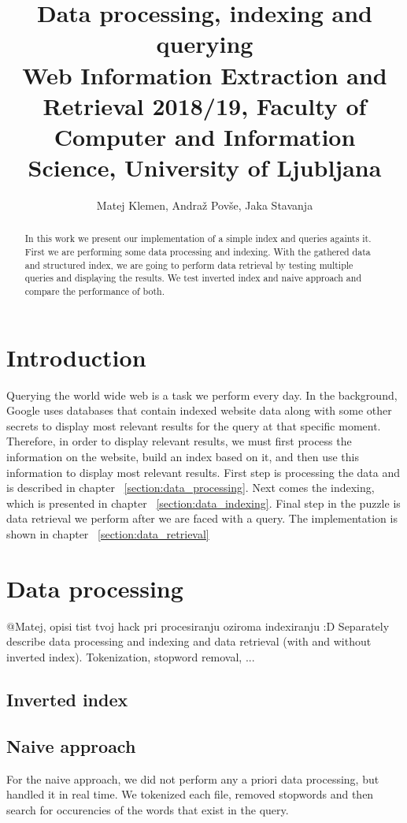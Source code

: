 \documentclass[9pt]{IEEEtran}
\title{\vspace{0ex} %
Data processing, indexing and querying
\\ \normalsize{Web Information Extraction and Retrieval 2018/19, Faculty of Computer and Information Science, University of Ljubljana}}
\author{ %
Matej Klemen, Andraž Povše, Jaka Stavanja
\vspace{-4.0ex}
}
\begin{document}
\maketitle

\begin{abstract}
In this work we present our implementation of a simple index and queries againts it.
First we are performing some data processing and indexing.
With the gathered data and structured index, we are going to perform data retrieval by testing multiple queries and displaying the results.
We test inverted index and naive approach and compare the performance of both.
\end{abstract}

\section{Introduction}
Querying the world wide web is a task we perform every day.
In the background, Google uses databases that contain indexed website data along with some other secrets to display most relevant results for the query at that specific moment.
Therefore, in order to display relevant results, we must first process the information on the website, build an index based on it, and then use this information to display most relevant results.
First step is processing the data and is described in chapter ~\ref{section:data_processing}.
Next comes the indexing, which is presented in chapter ~\ref{section:data_indexing}.
Final step in the puzzle is data retrieval we perform after we are faced with a query. The implementation is shown in chapter ~\ref{section:data_retrieval}

\section{Data processing}
@Matej, opisi tist tvoj hack pri procesiranju oziroma indexiranju :D 
\label{section:data_processing}
Separately describe data processing and indexing and data retrieval (with and without inverted index).
Tokenization, stopword removal, ...
\subsection{Inverted index}

\subsection{Naive approach}
For the naive approach, we did not perform any a priori data processing, but handled it in real time. 
We tokenized each file, removed stopwords and then search for occurencies of the words that exist in the query.
\end{document}
